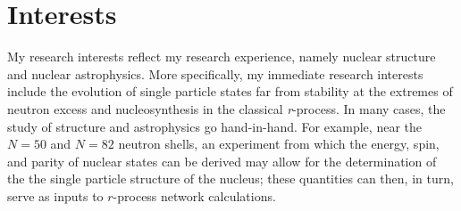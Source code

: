 {%
\section*{Interests}
My research interests reflect my research experience, namely nuclear structure and nuclear astrophysics.  More specifically, my immediate 
research interests include %
 the evolution of single particle states far from stability at the extremes of neutron excess and nucleosynthesis in the classical \textit{r}-process. %
 In many cases, the study of structure
and astrophysics go hand-in-hand. For example, %
near the $N=50$ and $N=82$ neutron shells,  
an experiment from which 
the energy, spin, and parity of nuclear states can be derived may allow for the determination of the 
the single particle structure of the nucleus; these quantities can then, in turn, serve as inputs to 
$r$-process %
network calculations. 

}
